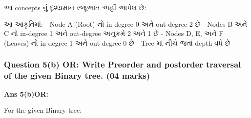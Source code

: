 આ concepts નું દૃશ્યમાન રજૂઆત અહીં આપેલ છે:

\begin{Shaded}
\begin{Highlighting}[]

\end{Highlighting}
\end{Shaded}

આ આકૃતિમાં: - Node A (Root) નો in-degree 0 અને out-degree 2 છે - Nodes B અને
C નો in-degree 1 અને out-degree અનુક્રમે 2 અને 1 છે - Nodes D, E, અને F
(Leaves) નો in-degree 1 અને out-degree 0 છે - Tree માં નીચે જતાં depth વધે છે

\hypertarget{question-5b-or-write-preorder-and-postorder-traversal-of-the-given-binary-tree.-04-marks}{%
\subsubsection{Question 5(b) OR: Write Preorder and postorder traversal
of the given Binary tree. (04
marks)}\label{question-5b-or-write-preorder-and-postorder-traversal-of-the-given-binary-tree.-04-marks}}

\textbf{Ans 5(b)OR:}

For the given Binary tree:

\begin{Shaded}
\begin{Highlighting}[]
    
\end{Highlighting}
\end{Shaded}

